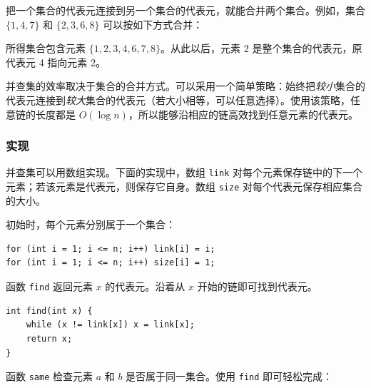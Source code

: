 把一个集合的代表元连接到另一个集合的代表元，就能合并两个集合。例如，集合 $\{1,4,7\}$ 和 $\{2,3,6,8\}$ 可以按如下方式合并：
\begin{center}
\end{center}

所得集合包含元素 $\{1,2,3,4,6,7,8\}$。从此以后，元素 2 是整个集合的代表元，原代表元 4 指向元素 2。

并查集的效率取决于集合的合并方式。可以采用一个简单策略：始终把\emph{较小}集合的代表元连接到\emph{较大}集合的代表元（若大小相等，可以任意选择）。使用该策略，任意链的长度都是 $O(\log n)$，所以能够沿相应的链高效找到任意元素的代表元。

\subsubsection{实现}

并查集可以用数组实现。下面的实现中，数组 \texttt{link} 对每个元素保存链中的下一个元素；若该元素是代表元，则保存它自身。数组 \texttt{size} 对每个代表元保存相应集合的大小。

初始时，每个元素分别属于一个集合：
\begin{lstlisting}
for (int i = 1; i <= n; i++) link[i] = i;
for (int i = 1; i <= n; i++) size[i] = 1;
\end{lstlisting}

函数 \texttt{find} 返回元素 $x$ 的代表元。沿着从 $x$ 开始的链即可找到代表元。

\begin{lstlisting}
int find(int x) {
    while (x != link[x]) x = link[x];
    return x;
}
\end{lstlisting}

函数 \texttt{same} 检查元素 $a$ 和 $b$ 是否属于同一集合。使用 \texttt{find} 即可轻松完成：

